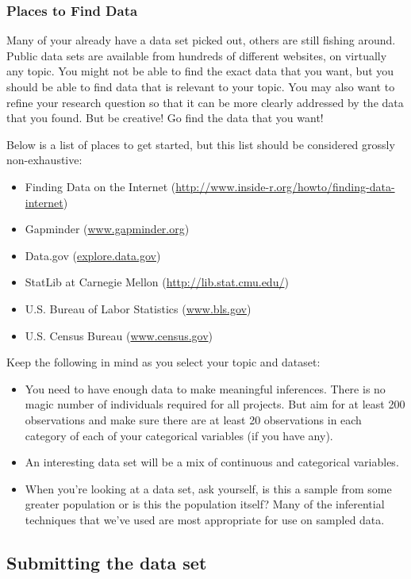 \documentclass[10pt]{article}
\begin{document}
\subsubsection*{Places to Find Data}
Many of your already have a data set picked out, others are still fishing around. Public data sets are available from hundreds of different websites, on virtually any topic. You might not be able to find the exact data that you want, but you should be able to find data that is relevant to your topic. You may also want to refine your research question so that it can be more clearly addressed by the data that you found. But be creative! Go find the data that you want!

Below is a list of places to get started, but this list should be considered grossly non-exhaustive:
  \begin{itemize}
		\item Finding Data on the Internet (\url{http://www.inside-r.org/howto/finding-data-internet})
		\item Gapminder (\url{www.gapminder.org})
		\item Data.gov (\url{explore.data.gov})
		\item StatLib at Carnegie Mellon (\url{http://lib.stat.cmu.edu/})
		\item U.S. Bureau of Labor Statistics (\url{www.bls.gov})
		\item U.S. Census Bureau (\url{www.census.gov})
	\end{itemize}

Keep the following in mind as you select your topic and dataset:
\begin{itemize}
		\item You need to have enough data to make meaningful inferences.  There is no magic number of individuals required for all projects.  But aim for at least 200 observations and make sure there are at least 20 observations in each category of each of your categorical variables (if you have any). 
		\item An interesting data set will be a mix of continuous and categorical variables.
    \item When you're looking at a data set, ask yourself, is this a sample from some greater population or is this the population itself? Many of the inferential techniques that we've used are most appropriate for use on sampled data.
	\end{itemize}

\subsection*{Submitting the data set}
\end{document}
